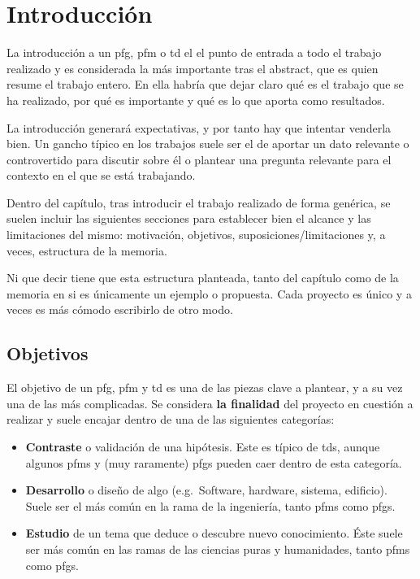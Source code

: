 \chapter{Introducción}
\label{ch:introduccion}

La introducción a un \gls{pfg}, \gls{pfm} o \gls{td} el el punto de entrada a todo el trabajo realizado y es considerada la más importante tras el abstract, que es quien resume el trabajo entero. En ella habría que dejar claro qué es el trabajo que se ha realizado, por qué es importante y qué es lo que aporta como resultados.

La introducción generará expectativas, y por tanto hay que intentar venderla bien. Un gancho típico en los trabajos suele ser el de aportar un dato relevante o controvertido para discutir sobre él o plantear una pregunta relevante para el contexto en el que se está trabajando.

Dentro del capítulo, tras introducir el trabajo realizado de forma genérica, se suelen incluir las siguientes secciones para establecer bien el alcance y las limitaciones del mismo: motivación, objetivos, suposiciones/limitaciones y, a veces, estructura de la memoria.

Ni que decir tiene que esta estructura planteada, tanto del capítulo como de la memoria en si es únicamente un ejemplo o propuesta. Cada proyecto es único y a veces es más cómodo escribirlo de otro modo.

\section{Objetivos}

El objetivo de un \gls{pfg}, \gls{pfm} y  \gls{td} es una de las piezas clave a plantear, y a su vez una de las más complicadas. Se considera \textbf{la finalidad} del proyecto en cuestión a realizar y suele encajar dentro de una de las siguientes categorías:

\begin{itemize}
    \item \textbf{Contraste} o validación de una hipótesis. Este es típico de \glspl{td}, aunque algunos \glspl{pfm} y (muy raramente) \glspl{pfg} pueden caer dentro de esta categoría.
    \item \textbf{Desarrollo} o diseño de algo (e.g.~Software, hardware, sistema, edificio). Suele ser el más común en la rama de la ingeniería, tanto \glspl{pfm} como \glspl{pfg}.
    \item \textbf{Estudio} de un tema que deduce o descubre nuevo conocimiento. Éste suele ser más común en las ramas de las ciencias puras y humanidades, tanto \glspl{pfm} como \glspl{pfg}.
\end{itemize}

